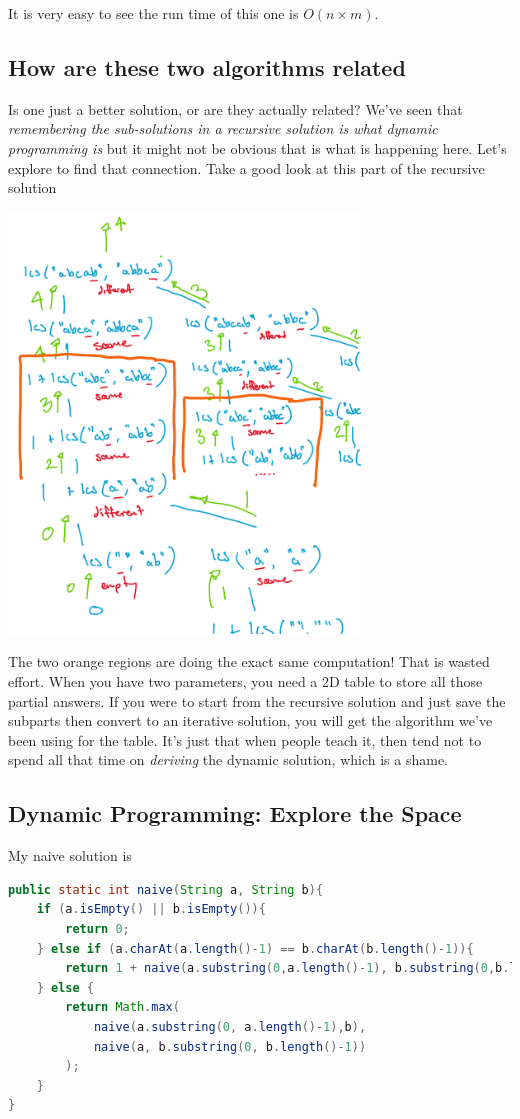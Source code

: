 \documentclass[twoside=false,DIV=14]{scrartcl}
\begin{document}
It is very easy to see the run time of this one is $O(n \times m)$.

\subsection{How are these two algorithms related}
Is one just a better solution, or are they actually related?  We've seen that \emph{remembering the sub-solutions in a recursive solution is what dynamic programming is} but it might not be obvious that is what is happening here.  Let's explore to find that connection.  Take a good look at this part of the recursive solution

\includegraphics[width=0.7\textwidth]{lcs_recursive_close.jpeg}

The two orange regions are doing the exact same computation!  That is wasted effort.  When you have two parameters, you need a 2D table to store all those partial answers.  If you were to start from the recursive solution and just save the subparts then convert to an iterative solution, you will get the algorithm we've been using for the table.  It's just that when people teach it, then tend not to spend all that time on \emph{deriving} the dynamic solution, which is a shame.

\subsection{Dynamic Programming: Explore the Space}
My naive solution is
\begin{lstlisting}[language=java]
public static int naive(String a, String b){
    if (a.isEmpty() || b.isEmpty()){
        return 0;
    } else if (a.charAt(a.length()-1) == b.charAt(b.length()-1)){
        return 1 + naive(a.substring(0,a.length()-1), b.substring(0,b.length()-1));
    } else {
        return Math.max(
            naive(a.substring(0, a.length()-1),b),
            naive(a, b.substring(0, b.length()-1))
        );
    }
}
\end{lstlisting}
\end{document}
